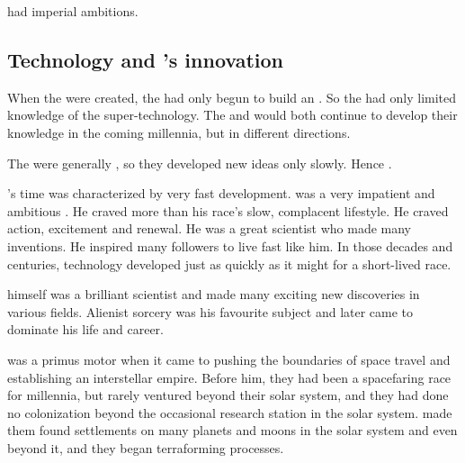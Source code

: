 \Sethicus had imperial ambitions. 










\subsection{Technology and \Sethicus's innovation}
When the \dragons were created, the \ophidians had only begun to build an . 
So the \dragons had only limited knowledge of the \ophidian super-technology.
The \dragons and \ophidians would both continue to develop their knowledge in the coming millennia, but in different directions. 

The \ophidians were generally , so they developed new ideas only slowly. 
Hence .

\Sethicus's time was characterized by very fast development. 
\Sethicus was a very impatient and ambitious \ophidian.
He craved more than his race's slow, complacent lifestyle.
He craved action, excitement and renewal.
He was a great scientist who made many inventions.
He inspired many followers to live fast like him. 
In those decades and centuries, technology developed just as quickly as it might for a short-lived race.

\Sethicus himself was a brilliant scientist and made many exciting new discoveries in various fields. 
Alienist sorcery was his favourite subject and later came to dominate his life and career. 

\Sethicus was a primus motor when it came to pushing the boundaries of space travel and establishing an interstellar \ophidian empire. 
Before him, they had been a spacefaring race for millennia, but rarely ventured beyond their solar system, and they had done no colonization beyond the occasional research station in the solar system. 
\Sethicus made them found settlements on many planets and moons in the solar system and even beyond it, and they began terraforming processes. 





